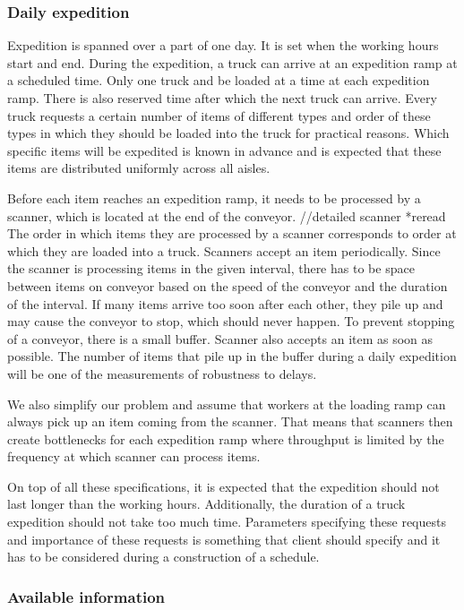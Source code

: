 \documentclass{ctuthesis}
\begin{document}
\subsubsection{Daily expedition}
Expedition is spanned over a part of one day. It is set when the working hours start and end. During the expedition, a truck can arrive at an expedition ramp at a scheduled time. Only one truck and be loaded at a time at each expedition ramp. There is also reserved time after which the next truck can arrive. Every truck requests a certain number of items of different types and order of these types in which they should be loaded into the truck for practical reasons. Which specific items will be expedited is known in advance and is expected that these items are distributed uniformly across all aisles. 

Before each item reaches an expedition ramp, it needs to be processed by a scanner, which is located at the end of the conveyor. 
//detailed scanner *reread
The order in which items they are processed by a scanner corresponds to order at which they are loaded into a truck. Scanners accept an item periodically. Since the scanner is processing items in the given interval, there has to be space between items on conveyor based on the speed of the conveyor and the duration of the interval. If many items arrive too soon after each other, they pile up and may cause the conveyor to stop, which should never happen. To prevent stopping of a conveyor, there is a small buffer. Scanner also accepts an item as soon as possible. The number of items that pile up in the buffer during a daily expedition will be one of the measurements of robustness to delays.

We also simplify our problem and assume that workers at the loading ramp can always pick up an item coming from the scanner. That means that scanners then create bottlenecks for each expedition ramp where throughput is limited by the frequency at which scanner can process items.

On top of all these specifications, it is expected that the expedition should not last longer than the working hours. Additionally, the duration of a truck expedition should not take too much time. Parameters specifying these requests and importance of these requests is something that client should specify and it has to be considered during a construction of a schedule.

\subsubsection{Available information}
\end{document}
